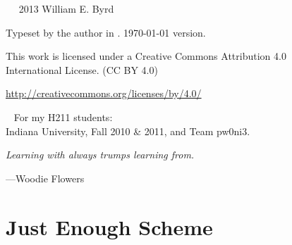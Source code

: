 \documentclass[11pt]{book}
\newcommand{\blankpage}{\newpage\hbox{}\thispagestyle{empty}\newpage} %
\begin{document}
\begin{schemeregion}

\frontmatter
{} %



\blankpage




\newpage

~\vfill
\thispagestyle{empty}
\setlength{\parindent}{0pt}
\setlength{\parskip}{\baselineskip}
\large
\noindent
\textcopyright~2013 William E. Byrd

\noindent
Typeset by the author in \XeLaTeX.
\today\xspace version.

\huge
\noindent
\ccLogo
\ccAttribution

\large
\noindent
This work is licensed under a Creative Commons Attribution 4.0\\International License.
(CC BY 4.0)

\noindent
\url{http://creativecommons.org/licenses/by/4.0/}
\normalsize



\cleardoublepage
\thispagestyle{empty}
~\vfill
\Large
For my H211 students: \\Indiana University, Fall 2010 \& 2011, and Team pw0ni3.
\begin{flushright}
\Large
\vspace{5mm}
\textit{Learning with always trumps learning from.}

---Woodie Flowers
\end{flushright}
\vfill
\vfill
\normalsize

\blankpage

\tableofcontents



\mainmatter
{}




\chapter{Just Enough Scheme}


\end{schemeregion}
\end{document}
